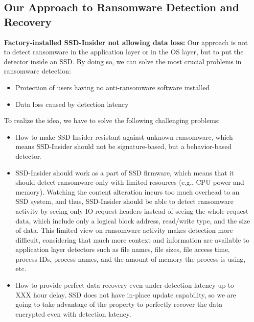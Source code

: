 \documentclass[conference]{IEEEtran}
\newcommand{\eg}{e.g.,\xspace}
\newcommand{\ours}{SSD-Insider}
\begin{document}
\subsection{Our Approach to Ransomware Detection and Recovery}
{\bf Factory-installed \ours{} not allowing data loss:} Our
approach is not to detect ransomware in the application layer or in
the OS layer, but to put the detector inside an SSD. By doing so,
we can solve the most crucial problems in ransomware detection: 
\begin{itemize}
    \item Protection of users having no anti-ransomware software installed
    \item Data loss caused by detection latency
\end{itemize}

To realize the idea, we have to solve the following challenging
problems: 
\begin{itemize}
    \item How to make \ours{} resistant against unknown ransomware, which means \ours{} should not be signature-based,
    but a behavior-based detector.
    \item \ours{} should work as a part of SSD firmware, which means that it should
    detect ransomware only with limited resources (\eg CPU power and memory). 
    Watching the content alteration incurs too much overhead to an SSD system,
    and thus, \ours{} should be able to detect ransomware activity 
    by seeing only IO request headers instead of seeing the whole request data, 
    which include only a logical block address, read/write type, and the size of data. 
    This limited view on ransomware activity makes detection more difficult,
    considering that much more context and information are available to application layer detectors 
    such as file names, file sizes, file access time, process IDs, process names, and the amount of memory 
    the process is using, etc. 
    \item How to provide perfect data recovery even under detection latency up to XXX hour delay. 
    SSD does not have in-place update capability, so we are going to take advantage of the property
    to perfectly recover the data encrypted even with detection latency.
\end{itemize}
\end{document}
